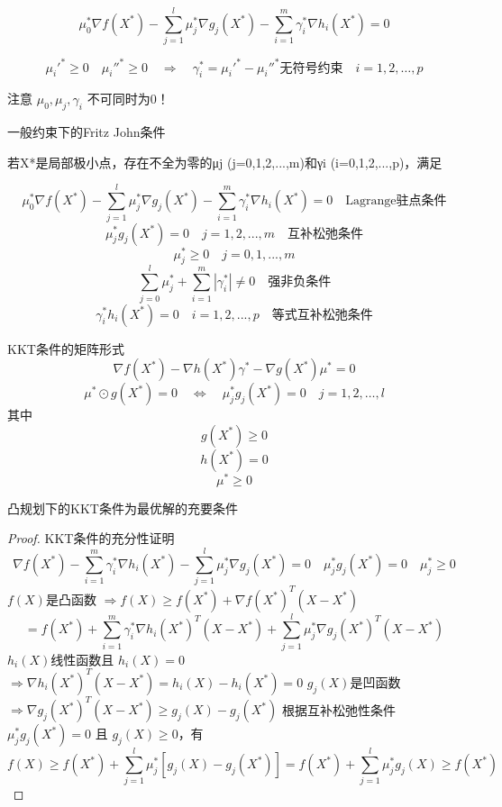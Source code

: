 \documentclass[12pt, a4paper, oneside, UTF8]{ctexbook}
\begin{document}
    \begin{equation*}
    \mu_0^* \nabla f(X^*) - \sum_{j=1}^l \mu_j^* \nabla g_j(X^*) - \sum_{i=1}^m \gamma_i^* \nabla h_i(X^*) = 0
    \end{equation*}
    
    \begin{equation*}
    \mu_i'^* \geq 0 \quad \mu_i''^* \geq 0 \quad \Rightarrow \quad \gamma_i^* = \mu_i'^* - \mu_i''^* \text{无符号约束} \quad i = 1, 2, \ldots, p
    \end{equation*}
    
注意 \(\mu_0, \mu_j, \gamma_i\) 不可同时为0！

\begin{definition}
    一般约束下的Fritz John条件

若X*是局部极小点，存在不全为零的μj (j=0,1,2,...,m)和γi (i=0,1,2,...,p)，满足

$$
\mu_0^* \nabla f(X^*) - \sum_{j=1}^{l} \mu_j^* \nabla g_j(X^*) - \sum_{i=1}^{m} \gamma_i^* \nabla h_i(X^*) = 0 \quad \text{Lagrange驻点条件}
$$
$$
\mu_j^* g_j(X^*) = 0 \quad j = 1, 2, ..., m \quad \text{互补松弛条件}
$$
$$
\mu_j^* \geq 0 \quad j = 0, 1, ..., m 
$$
$$
\sum_{j=0}^{l} \mu_j^* + \sum_{i=1}^{m} |\gamma_i^*| \neq 0 \quad \text{强非负条件}
$$
$$
\gamma_i^* h_i(X^*) = 0 \quad i = 1, 2, ..., p \quad \text{等式互补松弛条件}
$$
\end{definition}

\begin{definition}
    KKT条件的矩阵形式
$$
\nabla f(X^*) - \nabla h(X^*) \gamma^* - \nabla g(X^*) \mu^* = 0
$$
$$
\mu^* \odot g(X^*) = 0 \quad \Leftrightarrow \quad \mu_j^* g_j(X^*) = 0 \quad j = 1, 2, \ldots, l
$$
其中
$$
g(X^*) \geq 0
$$
$$
h(X^*) = 0
$$
$$
\mu^* \geq 0
$$
\end{definition}

\begin{theorem}
凸规划下的KKT条件为最优解的充要条件
\end{theorem}

\begin{proof}
    KKT条件的充分性证明
$$
\nabla f(X^*) - \sum_{i=1}^{m} \gamma_i^* \nabla h_i(X^*) - \sum_{j=1}^{l} \mu_j^* \nabla g_j(X^*) = 0 \quad \mu_j^* g_j(X^*) = 0 \quad \mu_j^* \geq 0
$$
$f(X)$是凸函数 $\Rightarrow f(X) \geq f(X^*) + \nabla f(X^*)^T (X - X^*)$
$$
= f(X^*) + \sum_{i=1}^{m} \gamma_i^* \nabla h_i(X^*)^T (X - X^*) + \sum_{j=1}^{l} \mu_j^* \nabla g_j(X^*)^T (X - X^*)
$$
$h_i(X)$线性函数且 $h_i(X) = 0$ $\Rightarrow \nabla h_i(X^*)^T (X - X^*) = h_i(X) - h_i(X^*) = 0$
$g_j(X)$是凹函数 $\Rightarrow \nabla g_j(X^*)^T (X - X^*) \geq g_j(X) - g_j(X^*)$
根据互补松弛性条件 $\mu_j^* g_j(X^*) = 0$ 且 $g_j(X) \geq 0$，有
$$
f(X) \geq f(X^*) + \sum_{j=1}^{l} \mu_j^* \left[ g_j(X) - g_j(X^*) \right] = f(X^*) + \sum_{j=1}^{l} \mu_j^* g_j(X) \geq f(X^*)
$$
\end{proof}



\ifx\allfiles\undefined
\end{document}
